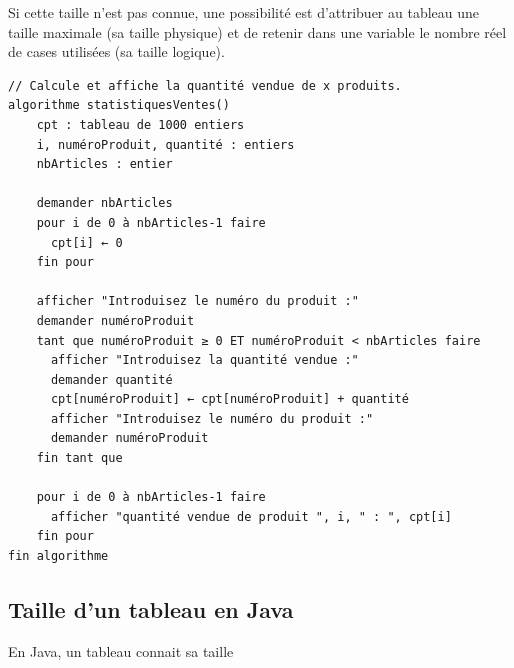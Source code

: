 \documentclass[11pt,a4paper]{article}
\begin{document}
            \par
        
		    Si cette taille n'est pas connue, une possibilit\'e est
        d'attribuer au tableau une taille maximale (sa taille physique) et de retenir dans une
        variable le nombre r\'eel de cases utilis\'ees (sa taille logique).
		  
            \par
        \begin{verbatim}
// Calcule et affiche la quantité vendue de x produits.
algorithme statistiquesVentes()
    cpt : tableau de 1000 entiers
    i, numéroProduit, quantité : entiers
    nbArticles : entier
    
    demander nbArticles
    pour i de 0 à nbArticles-1 faire
      cpt[i] ← 0
    fin pour
    
    afficher "Introduisez le numéro du produit :"
    demander numéroProduit
    tant que numéroProduit ≥ 0 ET numéroProduit < nbArticles faire
      afficher "Introduisez la quantité vendue :"
      demander quantité
      cpt[numéroProduit] ← cpt[numéroProduit] + quantité
      afficher "Introduisez le numéro du produit :"
      demander numéroProduit
    fin tant que
    
    pour i de 0 à nbArticles-1 faire
      afficher "quantité vendue de produit ", i, " : ", cpt[i]
    fin pour
fin algorithme
\end{verbatim}\subsection{Taille d'un tableau en Java}
		    En Java, un tableau connait sa taille
      
\end{document}
